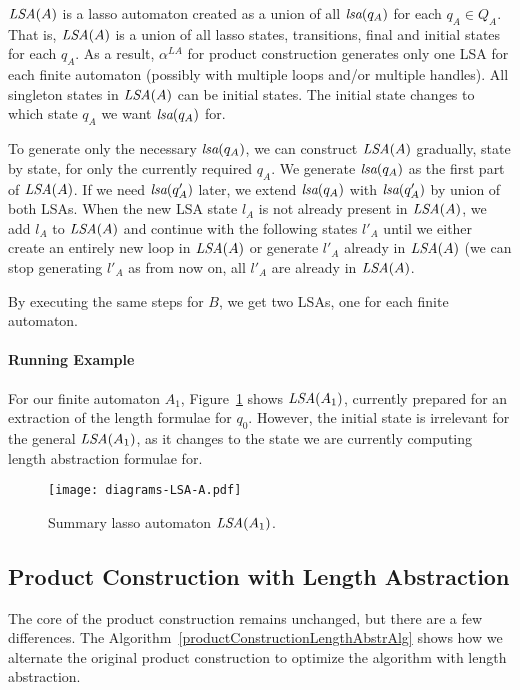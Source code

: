 $\emph{LSA}(A)$ is a lasso automaton created as a union of all $\emph{lsa}(q_A)$ for each $q_A \in Q_A$. That is, $\emph{LSA}(A)$ is a union of all lasso states, transitions, final and initial states for each $q_A$. As a result, $\alpha^{LA}$ for product construction generates only one LSA for each finite automaton (possibly with multiple loops and/or multiple handles). All singleton states in $\emph{LSA}(A)$ can be initial states. The initial state changes to which state $q_A$ we want $\emph{lsa}(q_A)$ for.

To generate only the necessary $\emph{lsa}(q_A)$, we can construct $\emph{LSA}(A)$ gradually, state by state, for only the currently required $q_A$. We generate $\emph{lsa}(q_A)$ as the first part of $\emph{LSA}(A)$. If we need $\emph{lsa}(q'_A)$ later, we extend $\emph{lsa}(q_A)$ with $\emph{lsa}(q'_A)$ by union of both LSAs. When the new LSA state $l_A$ is not already present in $\emph{LSA}(A)$, we add $l_A$ to $\emph{LSA}(A)$ and continue with the following states $l'_A$ until we either create an entirely new loop in $\emph{LSA}(A)$ or generate $l'_A$ already in $\emph{LSA}(A)$ (we can stop generating $l'_A$ as from now on, all $l'_A$ are already in $\emph{LSA}(A)$.

By executing the same steps for $B$, we get two LSAs, one for each finite automaton.

\paragraph{Running Example}

For our finite automaton $A_1$, Figure~\ref{fig:NFA_A1_LSA_A} shows $\emph{LSA}(A_1)$, currently prepared for an extraction of the length formulae for $q_0$. However, the initial state is irrelevant for the general $\emph{LSA}(A_1)$, as it changes to the state we are currently computing length abstraction formulae for.

\begin{figure}[ht]
	\centering
	\texttt{[image: diagrams-LSA-A.pdf]}
	\caption{Summary lasso automaton $\emph{LSA}(A_1)$.}
	\label{fig:NFA_A1_LSA_A}
\end{figure}

\subsection{Product Construction with Length Abstraction}

The core of the product construction remains unchanged, but there are a few differences. The Algorithm~\ref{productConstructionLengthAbstrAlg} shows how we alternate the original product construction to optimize the algorithm with length abstraction.

